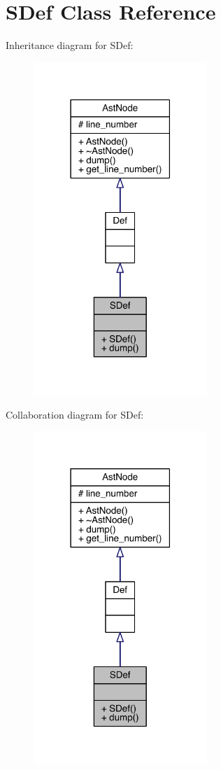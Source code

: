 \hypertarget{class_s_def}{}\section{S\+Def Class Reference}
\label{class_s_def}


Inheritance diagram for S\+Def\+:\nopagebreak
\begin{figure}[H]
\begin{center}
\leavevmode
\includegraphics[width=186pt]{class_s_def__inherit__graph}
\end{center}
\end{figure}


Collaboration diagram for S\+Def\+:\nopagebreak
\begin{figure}[H]
\begin{center}
\leavevmode
\includegraphics[width=186pt]{class_s_def__coll__graph}
\end{center}
\end{figure}
